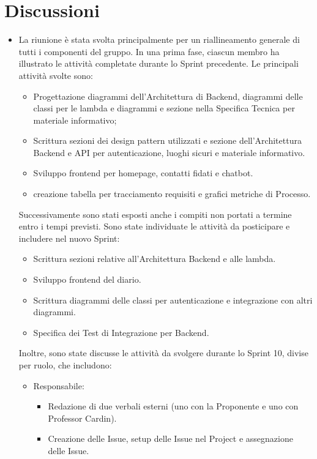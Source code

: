 \documentclass[a4paper,12pt]{article}
\begin{document}
\section{Discussioni}
\begin{itemize}
    \item La riunione è stata svolta principalmente per un riallineamento generale di tutti i componenti del gruppo. In una prima fase, ciascun membro ha illustrato le attività completate durante lo Sprint precedente. Le principali attività svolte sono:
    \begin{itemize}
        \item Progettazione diagrammi dell'Architettura di Backend, diagrammi delle classi per le lambda e diagrammi e sezione nella Specifica Tecnica per materiale informativo;
        \item Scrittura sezioni dei design pattern utilizzati e sezione dell'Architettura Backend e API per autenticazione, luoghi sicuri e materiale informativo.
        \item Sviluppo frontend per homepage, contatti fidati e chatbot.
        \item creazione tabella per tracciamento requisiti e grafici metriche di Processo.
    \end{itemize}
    Successivamente sono stati esposti anche i compiti non portati a termine entro i tempi previsti. Sono state individuate le attività da posticipare e includere nel nuovo Sprint:
    \begin{itemize}
        \item Scrittura sezioni relative all'Architettura Backend e alle lambda.
        \item Sviluppo frontend del diario.
        \item Scrittura diagrammi delle classi per autenticazione e integrazione con altri diagrammi.
        \item Specifica dei Test di Integrazione per Backend.
    \end{itemize}
    Inoltre, sono state discusse le attività da svolgere durante lo Sprint 10, divise per ruolo, che includono:
    \begin{itemize}
    \item Responsabile:
    \begin{itemize}
        \item Redazione di due verbali esterni (uno con la Proponente e uno con Professor Cardin).
        \item Creazione delle Issue, setup delle Issue nel Project e assegnazione delle Issue.

\end{itemize}
\end{itemize}
\end{itemize}
\end{document}

